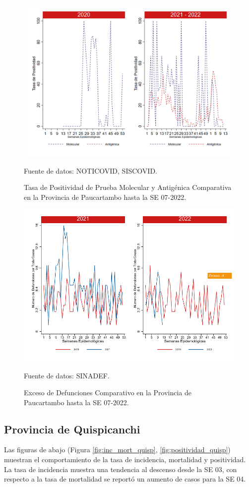 \documentclass[12pt,a4paper,openany]{book}
\begin{document}
		\begin{figure}[h]
			\caption{Tasa de Positividad de Prueba Molecular y Antigénica Comparativa en la Provincia de Paucartambo hasta la SE 07-2022.}\label{fig:positividad_paucartam}
			\begin{center}
				\includegraphics[width=0.7\linewidth]{../figuras/positividad_20_21_11.png}
			\end{center}
			{\footnotesize {Fuente de datos: NOTICOVID, SISCOVID.}}
		\end{figure}
		
		\begin{figure}[h]
			\caption{Exceso de Defunciones Comparativo en la Provincia de Paucartambo hasta la SE 07-2022.}\label{fig:exceso_paucartam}
			\begin{center}
				\includegraphics[width=0.7\linewidth]{../figuras/exceso_11.pdf}
			\end{center}
			{\footnotesize {Fuente de datos: SINADEF.}}
		\end{figure}
		
		\clearpage
		
		\subsection*{Provincia de Quispicanchi}
		\noindent Las figuras de abajo (Figura \ref{fig:inc_mort_quisp}, \ref{fig:positividad_quisp}) muestran el comportamiento de la tasa de incidencia, mortalidad y positividad. La tasa de incidencia muestra una tendencia al descenso desde la SE 03, con respecto a la tasa de mortalidad se reportó un aumento de casos para la SE 04.      
		
\end{document}
